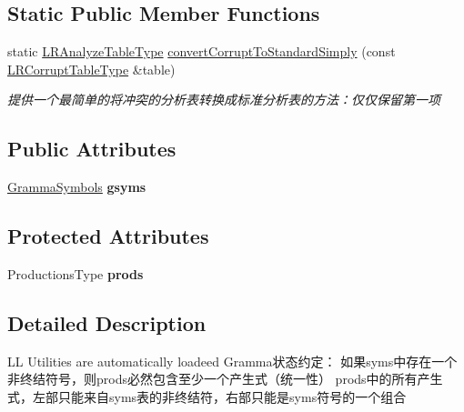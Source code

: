 \subsection*{Static Public Member Functions}
\begin{DoxyCompactItemize}
\item 
\mbox{\label{classx2_1_1_gramma_a803bd74e9d0c3d7199bc03439b1df537}} 
static \hyperlink{classx2_1_1_gramma_a33681053b045219ea58cc68c3faa4975}{L\+R\+Analyze\+Table\+Type} \hyperlink{classx2_1_1_gramma_a803bd74e9d0c3d7199bc03439b1df537}{convert\+Corrupt\+To\+Standard\+Simply} (const \hyperlink{classx2_1_1_gramma_a03901eb5b196689b901fbf23e5bb9f0e}{L\+R\+Corrupt\+Table\+Type} \&table)
\begin{DoxyCompactList}\small\item\em 提供一个最简单的将冲突的分析表转换成标准分析表的方法：仅仅保留第一项 \end{DoxyCompactList}\end{DoxyCompactItemize}
\subsection*{Public Attributes}
\begin{DoxyCompactItemize}
\item 
\mbox{\label{classx2_1_1_gramma_af1a00aadbdd36bb81faf35c739eca913}} 
\hyperlink{classx2_1_1_gramma_symbols}{Gramma\+Symbols} {\bfseries gsyms}
\end{DoxyCompactItemize}
\subsection*{Protected Attributes}
\begin{DoxyCompactItemize}
\item 
\mbox{\label{classx2_1_1_gramma_a0b545b47424e8e783b21e84ac746eb05}} 
Productions\+Type {\bfseries prods}
\end{DoxyCompactItemize}


\subsection{Detailed Description}
LL Utilities are automatically loadeed Gramma状态约定： 如果syms中存在一个非终结符号，则prods必然包含至少一个产生式（统一性） prods中的所有产生式，左部只能来自syms表的非终结符，右部只能是syms符号的一个组合

